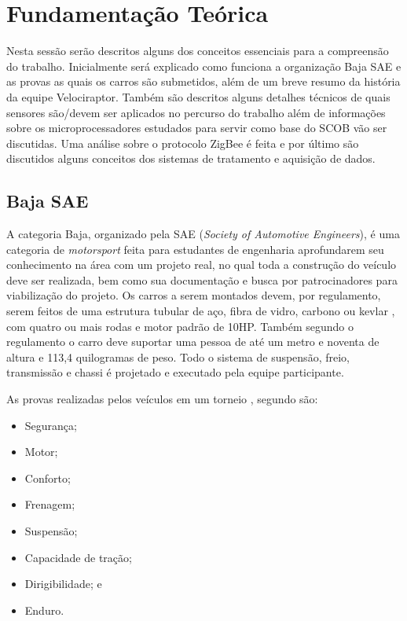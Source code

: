 \chapter{Fundamentação Teórica}
	\label{ch:fundamentacao}
Nesta sessão serão descritos alguns dos conceitos essenciais para a compreensão do trabalho. Inicialmente será explicado como funciona a organização Baja SAE e as provas as quais os carros são submetidos, além de um breve resumo da história da equipe Velociraptor. Também são descritos alguns detalhes técnicos de quais sensores são/devem ser aplicados no percurso do trabalho além de informações sobre os microprocessadores estudados para servir como base do SCOB vão ser discutidas. Uma análise sobre o protocolo ZigBee é feita e por último são discutidos alguns conceitos dos sistemas de tratamento e aquisição de dados.

\section{Baja SAE}
A categoria Baja, organizado pela SAE (\textit{Society of Automotive Engineers}), é uma categoria de \textit{motorsport} feita para estudantes de engenharia aprofundarem seu conhecimento na área com um projeto real, no qual toda a construção do veículo deve ser realizada, bem como sua documentação e busca por patrocinadores para viabilização do projeto. Os carros a serem montados devem, por regulamento, \cite{regulamentobajasae} serem feitos de uma estrutura tubular de aço, fibra de vidro, carbono ou kevlar \cite{projetoMiniBaja2006}, com quatro ou mais rodas e motor padrão de 10HP. Também segundo o regulamento o carro deve suportar uma pessoa de até um metro e noventa de altura e 113,4 quilogramas de peso. Todo o sistema de suspensão, freio, transmissão e chassi é projetado e executado pela equipe participante.  

As provas realizadas pelos veículos em um torneio , segundo \cite{bajasae} são:
\begin{itemize}
	\item Segurança;
	\item Motor;
	\item Conforto;
	\item Frenagem;
	\item Suspensão;
	\item Capacidade de tração;
	\item Dirigibilidade; e
	\item Enduro.
\end{itemize}

